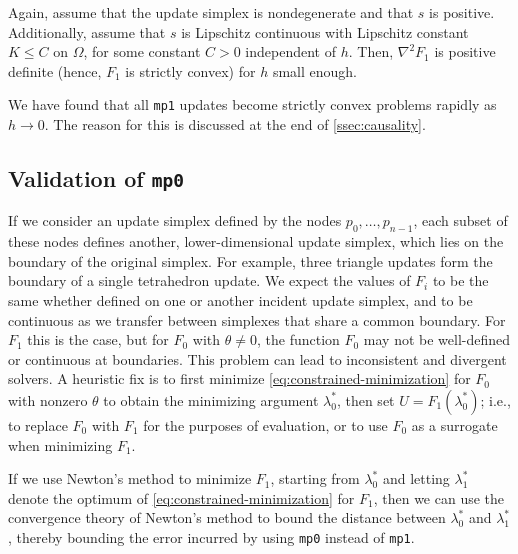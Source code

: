 \documentclass[sisc-eikonal.tex]{subfiles}
\begin{document}
\begin{lemma}\label{lemma:F-strictly-convex}
  Again, assume that the update simplex is nondegenerate and that $s$
  is positive. Additionally, assume that $s$ is Lipschitz continuous
  with Lipschitz constant $K \leq C$ on $\Omega$, for some constant
  $C > 0$ independent of $h$. Then, $\nabla^2 F_1$ is positive
  definite (hence, $F_1$ is strictly convex) for $h$ small enough.
\end{lemma}

We have found that all \texttt{mp1} updates become strictly convex
problems rapidly as $h \to 0$. The reason for this is discussed at the
end of \cref{ssec:causality}.

\subsection{Validation of \texttt{mp0}}\label{ssec:validation}

If we consider an update simplex defined by the nodes
$p_0, \hdots, p_{n-1}$, each subset of these nodes defines another,
lower-dimensional update simplex, which lies on the boundary of the
original simplex. For example, three triangle updates form the
boundary of a single tetrahedron update. We expect the values of $F_i$
to be the same whether defined on one or another incident update
simplex, and to be continuous as we transfer between simplexes that
share a common boundary. For $F_1$ this is the case, but for $F_0$
with $\theta \neq 0$, the function $F_0$ may not be well-defined or
continuous at boundaries. This problem can lead to inconsistent and
divergent solvers. A heuristic fix is to first minimize
\cref{eq:constrained-minimization} for $F_0$ with nonzero $\theta$ to
obtain the minimizing argument $\lambda^*_0$, then set
$\hat{U} = F_1(\lambda_0^*)$; i.e., to replace $F_0$ with $F_1$ for
the purposes of evaluation, or to use $F_0$ as a surrogate when
minimizing $F_1$.

If we use Newton's method to minimize $F_1$, starting from
$\lambda_0^*$ and letting $\lambda_1^*$ denote the optimum of
\cref{eq:constrained-minimization} for $F_1$, then we can use the
convergence theory of Newton's method to bound the distance between
$\lambda_0^*$ and $\lambda_1^*$, thereby bounding the error incurred
by using \texttt{mp0} instead of \texttt{mp1}.
\end{document}
